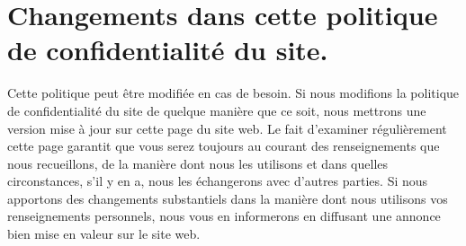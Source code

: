 \section{Changements dans cette politique de confidentialité du site.}

Cette politique peut être modifiée en cas de besoin. Si nous modifions la politique de confidentialité du site de quelque manière que ce soit, nous mettrons une version mise à jour sur cette page du site web. Le fait d'examiner régulièrement cette page garantit que vous serez toujours au courant des renseignements que nous recueillons, de la manière dont nous les utilisons et dans quelles circonstances, s'il y en a, nous les échangerons avec d'autres parties. Si nous apportons des changements substantiels dans la manière dont nous utilisons vos renseignements personnels, nous vous en informerons en diffusant une annonce bien mise en valeur sur le site web.
